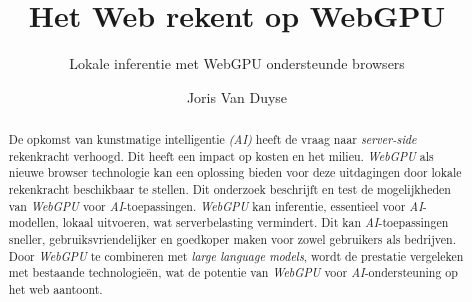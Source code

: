 \documentclass[a0,portrait]{hogent-poster}
\title{Het Web rekent op WebGPU}
\subtitle{Lokale inferentie met WebGPU ondersteunde browsers}
\author{Joris Van Duyse}
\begin{document}
\maketitle

\begin{abstract}
  De opkomst van kunstmatige intelligentie \textit{(AI)} heeft de vraag naar \textit{server-side} rekenkracht verhoogd. Dit heeft een impact op kosten en het milieu. \textit{WebGPU} als nieuwe browser technologie kan een oplossing bieden voor deze uitdagingen door lokale rekenkracht beschikbaar te stellen. Dit onderzoek beschrijft en test de mogelijkheden van \textit{WebGPU} voor \textit{AI}-toepassingen. \textit{WebGPU} kan inferentie, essentieel voor \textit{AI}-modellen, lokaal uitvoeren, wat serverbelasting vermindert. Dit kan \textit{AI}-toepassingen sneller, gebruiksvriendelijker en goedkoper maken voor zowel gebruikers als bedrijven. Door \textit{WebGPU} te combineren met \textit{large language models}, wordt de prestatie vergeleken met bestaande technologieën, wat de potentie van \textit{WebGPU} voor \textit{AI}-ondersteuning op het web aantoont.
\end{abstract}
\end{document}
